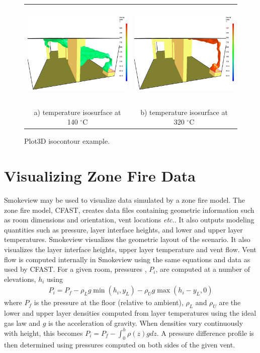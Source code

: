 \documentclass[11pt,twoside]{book}
\newcommand{\degC}{$^\circ$C}
\newcommand{\figoptions}{hbp}
\begin{document}
\begin{figure}[\figoptions]
\begin{center}
\begin{tabular}{cc}
\includegraphics[height=2.0in]{figures/roomfire_iso2}
&\includegraphics[height=2.0in]{figures/roomfire_iso1}\\
a) temperature isosurface at 140 \degC&b) temperature
isosurface at 320 \degC
\end{tabular}
\end{center}
\caption{Plot3D isocontour example.}
\label{fig3dcontour}%
\end{figure}

\chapter{Visualizing Zone Fire Data}
Smokeview may be used to visualize data simulated by a zone fire model.
The zone fire model, CFAST\cite{Jones:2004A}, creates data files containing geometric information such as room dimensions and orientation, vent locations {\em etc.}.  It also outputs modeling quantities such as pressure, layer interface heights, and lower and upper layer temperatures.
Smokeview visualizes the geometric layout of the scenario.  It also visualizes the layer interface heights, upper layer temperature and vent flow.
Vent flow
is computed internally in Smokeview using the same equations and data as used by CFAST.   For a given room, pressures , $P_i$, are computed at a number of elevations, $h_i$ using
\begin{eqnarray*}
P_i=P_f - \rho_L g \min(h_i,y_L) - \rho_U g \max(h_i-y_L,0)
\end{eqnarray*}
where $P_f$ is the pressure at the floor (relative to ambient), $\rho_L$ and $\rho_U$ are the lower and upper layer densities computed from layer temperatures using the ideal gas law and $g$ is the acceleration of gravity.  When densities vary continuously with height, this becomes $P_i=P_f-\int_0^h \rho(z)gdz$.
A pressure difference profile is then determined using pressures computed on both sides of the given vent.
\end{document}
